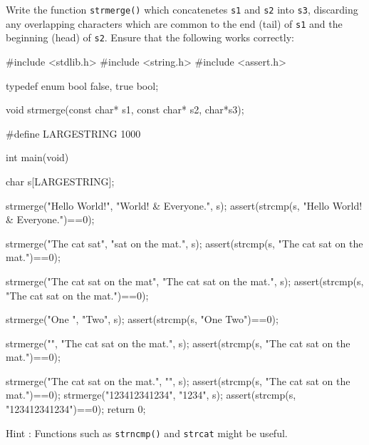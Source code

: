 
\toohard 

\begin{exercise}
Write the function \verb^strmerge()^ which concatenetes \verb^s1^ and \verb^s2^ into \verb^s3^,
discarding any overlapping characters which are common to the end (tail) of \verb^s1^ and the 
beginning (head) of \verb^s2^.
Ensure that the following
works correctly:
\begin{codesnippet}
#include <stdlib.h>
#include <string.h>
#include <assert.h>

typedef enum bool {false, true} bool;

void strmerge(const char* s1, const char* s2, char*s3);

#define LARGESTRING 1000

int main(void)
{
   char s[LARGESTRING];

   strmerge("Hello World!", "World! & Everyone.", s);
   assert(strcmp(s, "Hello World! & Everyone.")==0);

   strmerge("The cat sat", "sat on the mat.", s);
   assert(strcmp(s, "The cat sat on the mat.")==0);

   strmerge("The cat sat on the mat", "The cat sat on the mat.", s);
   assert(strcmp(s, "The cat sat on the mat.")==0);

   strmerge("One ", "Two", s);
   assert(strcmp(s, "One Two")==0);

   strmerge("", "The cat sat on the mat.", s);
   assert(strcmp(s, "The cat sat on the mat.")==0);

   strmerge("The cat sat on the mat.", "", s);
   assert(strcmp(s, "The cat sat on the mat.")==0);
                                                                                                                                                    strmerge("123412341234", "1234", s);
   assert(strcmp(s, "123412341234")==0);
                                                                                                                                                    return 0;
}
\end{codesnippet}
Hint : Functions such as \verb^strncmp()^ and \verb^strcat^ might be useful.
\end{exercise}
